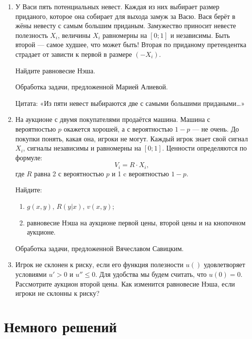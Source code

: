 \begin{enumerate}
\item У Васи пять потенциальных невест. Каждая из них выбирает размер приданого, которое она собирает для выхода замуж за Васю. Вася берёт в жёны невесту с самым большим приданым. Замужество приносит невесте полезность $X_{i}$, величины $X_{i}$ равномерны на $[0;1]$ и независимы. Быть второй — самое худшее, что может быть! Вторая по приданому претендентка страдает от зависти к первой в размере $(-X_{i})$.

Найдите равновесие Нэша.


Обработка задачи, предложенной Марией Алиевой.

Цитата: «Из пяти невест выбираются две с самыми большими придаными\ldots»

\item На аукционе с двумя покупателями продаётся машина. Машина с вероятностью $p$ окажется хорошей, а с вероятностью $1-p$ — не очень. До покупки понять, какая она, игроки не могут. Каждый игрок знает свой сигнал $X_{i}$, сигналы независимы и равномерны на $[0;1]$. Ценности определяются по формуле:
\begin{equation}
V_{i}=R\cdot X_{i},
\end{equation}
где $R$ равна 2 с вероятностью $p$ и 1 c вероятностью $1-p$.

Найдите:
\begin{enumerate}
\item $g(x,y)$, $R(y|x)$, $v(x,y)$;
\item равновесие Нэша на аукционе первой цены, второй цены и на кнопочном аукционе.
\end{enumerate}

Обработка задачи, предложенной Вячеславом Савицким.

\item Игрок не склонен к риску, если его функция полезности $u()$ удовлетворяет условиями $ u'>0 $ и $ u''\leq 0 $. Для удобства мы будем считать, что $u(0)=0$. Рассмотрите аукцион второй цены. Как изменится равновесие Нэша, если игроки не склонны к риску?


\end{enumerate}


\section{Немного решений}


